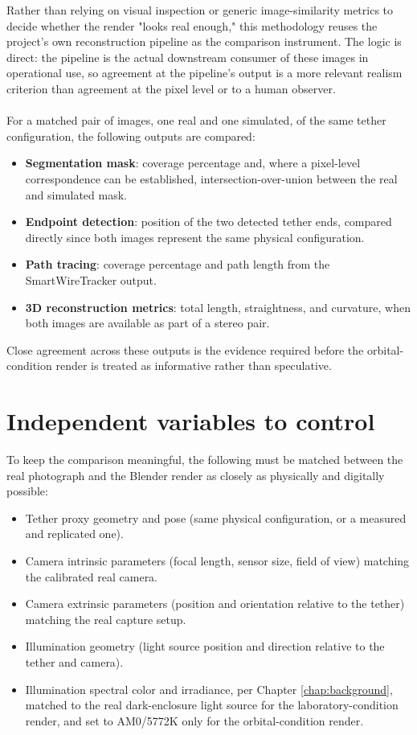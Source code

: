 Rather than relying on visual inspection or generic image-similarity metrics to decide whether the render "looks real enough," this methodology reuses the project's own reconstruction pipeline as the comparison instrument. The logic is direct: the pipeline is the actual downstream consumer of these images in operational use, so agreement at the pipeline's output is a more relevant realism criterion than agreement at the pixel level or to a human observer.
\\\\
For a matched pair of images, one real and one simulated, of the same tether configuration, the following outputs are compared:

\begin{itemize}
    \item \textbf{Segmentation mask}: coverage percentage and, where a pixel-level correspondence can be established, intersection-over-union between the real and simulated mask.
    \item \textbf{Endpoint detection}: position of the two detected tether ends, compared directly since both images represent the same physical configuration.
    \item \textbf{Path tracing}: coverage percentage and path length from the SmartWireTracker output.
    \item \textbf{3D reconstruction metrics}: total length, straightness, and curvature, when both images are available as part of a stereo pair.
\end{itemize}

Close agreement across these outputs is the evidence required before the orbital-condition render is treated as informative rather than speculative.

\section{Independent variables to control}

To keep the comparison meaningful, the following must be matched between the real photograph and the Blender render as closely as physically and digitally possible:

\begin{itemize}
    \item Tether proxy geometry and pose (same physical configuration, or a measured and replicated one).
    \item Camera intrinsic parameters (focal length, sensor size, field of view) matching the calibrated real camera.
    \item Camera extrinsic parameters (position and orientation relative to the tether) matching the real capture setup.
    \item Illumination geometry (light source position and direction relative to the tether and camera).
    \item Illumination spectral color and irradiance, per Chapter \ref{chap:background}, matched to the real dark-enclosure light source for the laboratory-condition render, and set to AM0/5772K only for the orbital-condition render.
\end{itemize}

